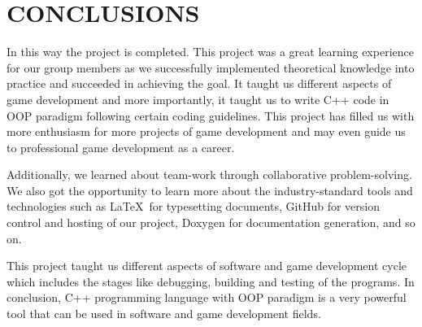 \documentclass[main]{subfiles}
\begin{document}
\chapter{CONCLUSIONS}
In this way the project is completed. This project was a great learning experience for our group members as we successfully implemented theoretical knowledge into practice and succeeded in achieving the goal. It taught us different aspects of game development and more importantly, it taught us to write C++ code in OOP paradigm following certain coding guidelines. This project has filled us with more enthusiasm for more projects of game development and may even guide us to professional game development as a career.

Additionally, we learned about team-work through collaborative problem-solving. We also got the opportunity to learn more about the industry-standard tools and technologies such as \LaTeX\ for typesetting documents, GitHub for version control and hosting of our project, Doxygen for documentation generation, and so on.

This project taught us different aspects of software and game development cycle which includes the stages like debugging, building and testing of the programs. In conclusion, C++ programming language with OOP paradigm is a very powerful tool that can be used in software and game development fields.
\end{document}
